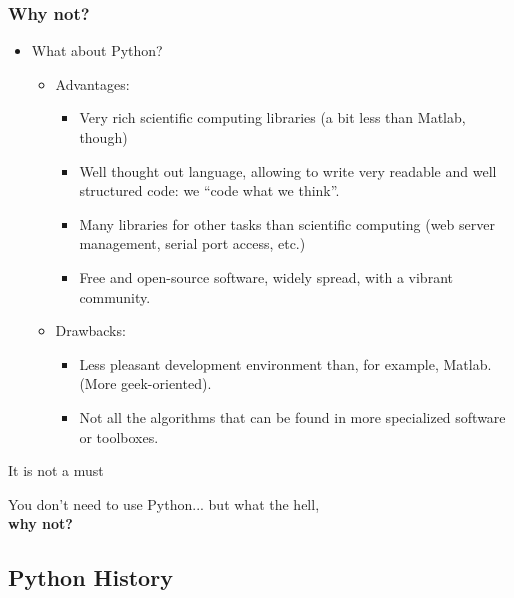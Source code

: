 \documentclass[colorlinks]{beamer}
\begin{document}
\begin{frame}[fragile]\frametitle{Why not?}

 \begin{itemize}
    \item What about Python?
        \begin{itemize}
            \item Advantages:
                \begin{itemize}
                     \item \tiny Very rich scientific computing libraries (a bit less than Matlab, though)
                    \item \tiny Well thought out language, allowing to write very readable and well structured code: we “code what we think”.
                    \item \tiny Many libraries for other tasks than scientific computing (web server management, serial port access, etc.)
                    \item \tiny Free and open-source software, widely spread, with a vibrant community.
                \end{itemize}
            \item Drawbacks:
                \begin{itemize}
                    \item \tiny Less pleasant development environment than, for example, Matlab. (More geek-oriented).
                    \item \tiny Not all the algorithms that can be found in more specialized software or toolboxes. 
                \end{itemize}
        \end{itemize}
\end{itemize}
\begin{block}{\begin{center}
    It is not a must
\end{center}}
\begin{center}
You don't need to use Python... but  what the hell,\\ \textbf{why not?}\end{center}
\end{block}


\end{frame}

\subsection{Python History}
\end{document}
